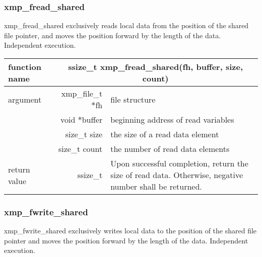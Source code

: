    \subsubsection{xmp\_fread\_shared}

   xmp\_fread\_shared exclusively reads local data from the position of
   the shared file pointer, and moves the position forward by the length
   of the data.
   Independent execution.

   \begin{table}[h]
    \begin{center}
     \begin{tabular}{|l|r|p{80mm}|}
      \hline
      {\bf function name}  & \multicolumn{2}{c|}{\bf ssize\_t
      xmp\_fread\_shared(fh, buffer, size, count)}  \\ \hline \hline
      argument & xmp\_file\_t $*$fh & file structure \\ \cline{2-3}
      & void $*$buffer & beginning address of read variables \\ \cline{2-3}
      & size\_t size & the size of a read data element \\ \cline{2-3}
      & size\_t count & the number of read data elements \\ \hline
      return value & ssize\_t & Upon successful completion, return the size
	      of read data. Otherwise, negative number shall be
	      returned. \\ \hline
      \end{tabular}
     \end{center}
   \end{table}

   \subsubsection{xmp\_fwrite\_shared}
   xmp\_fwrite\_shared exclusively writes local data to the
   position of the shared file pointer and moves the position forward by
   the length of the data.
   Independent execution.

